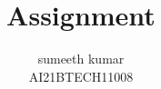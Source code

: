 \documentclass[journal,12pt,twocolumn]{IEEEtran}
\begin{document}
\let\vec\mathbf
\renewcommand{\thefigure}{\theproblem}
\def\putbox#1#2#3{\makebox[0in][l]{\makebox[#1][l]{}\raisebox{\baselineskip}[0in][0in]{\raisebox{#2}[0in][0in]{#3}}}}
     \def\rightbox#1{\makebox[0in][r]{#1}}
     \def\centbox#1{\makebox[0in]{#1}}
     \def\topbox#1{\raisebox{-\baselineskip}[0in][0in]{#1}}
     \def\midbox#1{\raisebox{-0.5\baselineskip}[0in][0in]{#1}}
\title{
	Assignment
}
\author{ sumeeth kumar\\AI21BTECH11008
}	
%
%
%
% 
%
\end{document}
